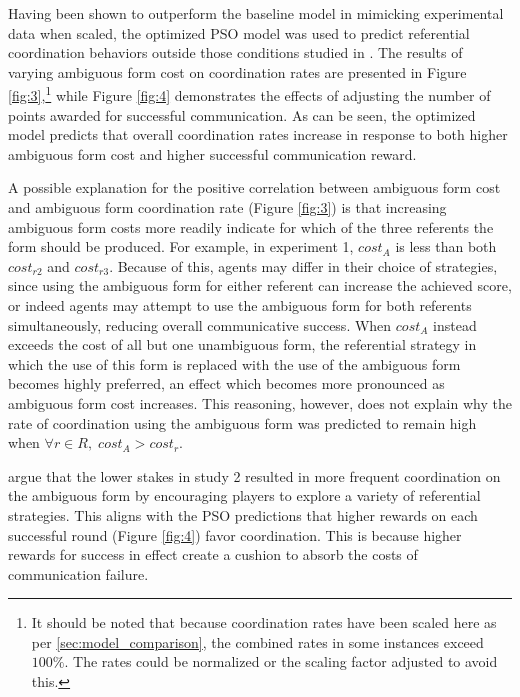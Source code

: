 \documentclass[a4paper,11pt]{article}
\begin{document}
Having been shown to outperform the baseline model in mimicking experimental data when scaled, the optimized PSO model was used to predict referential coordination behaviors outside those conditions studied in . The results of varying ambiguous form cost on coordination rates are presented in Figure \ref{fig:3},\footnote{It should be noted that because coordination rates have been scaled here as per \ref{sec:model_comparison}, the combined rates in some instances exceed $100\%$. The rates could be normalized or the scaling factor adjusted to avoid this.} while Figure \ref{fig:4} demonstrates the effects of adjusting the number of points awarded for successful communication. As can be seen, the optimized model predicts that overall coordination rates increase in response to both higher ambiguous form cost and higher successful communication reward.


A possible explanation for the positive correlation between ambiguous form cost and ambiguous form coordination rate (Figure \ref{fig:3}) is that increasing ambiguous form costs more readily indicate for which of the three referents the form should be produced. For example, in experiment 1, $cost_A$ is less than both $cost_{r2}$ and $cost_{r3}$. Because of this, agents may differ in their choice of strategies, since using the ambiguous form for either referent can increase the achieved score, or indeed agents may attempt to use the ambiguous form for both referents simultaneously, reducing overall communicative success. When $cost_A$ instead exceeds the cost of all but one unambiguous form, the referential strategy in which the use of this form is replaced with the use of the ambiguous form becomes highly preferred, an effect which becomes more pronounced as ambiguous form cost increases. This reasoning, however, does not explain why the rate of coordination using the ambiguous form was predicted to remain high when $\forall r \in R,\; cost_A > cost_r$.


\citeauthor{rohde2012} argue that the lower stakes in study 2 resulted in more frequent coordination on the ambiguous form by encouraging players to explore a variety of referential strategies. This aligns with the PSO predictions that higher rewards on each successful round (Figure \ref{fig:4}) favor coordination.  This is because higher rewards for success in effect create a cushion to absorb the costs of communication failure.
\end{document}
